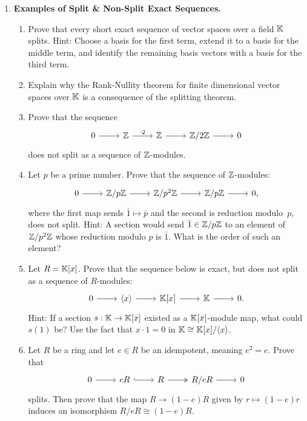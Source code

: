 \documentclass[12pt,reqno]{amsart}
\begin{document}
\begin{enumerate}[leftmargin=*, resume=problems]
\item \textbf{Examples of Split \& Non-Split Exact Sequences.}
\begin{enumerate}
\item Prove that every short exact sequence of vector spaces over a field $\mathbb{K}$ splits. Hint: Choose a basis for the first term, extend it to a basis for the middle term, and identify the remaining basis vectors with a basis for the third term. 
\item Explain why the Rank-Nullity theorem for finite dimensional vector spaces over $\mathbb{K}$ is a consequence of the splitting theorem. 
\item Prove that the sequence
\[
\begin{tikzcd}
0 \ar[r] & \ZZ \ar[r, "\cdot 2"] & \ZZ \ar[r] & \ZZ/2\ZZ \ar[r] & 0
\end{tikzcd}
\]
does not split as a sequence of $\mathbb{Z}$-modules.
\item Let $p$ be a prime number. Prove that the sequence of $\mathbb{Z}$-modules:
\[
\begin{tikzcd}
0 \ar[r] & \ZZ/p\ZZ \ar[r] & \ZZ/p^2\ZZ \ar[r] & \ZZ/p\ZZ \ar[r] & 0,
\end{tikzcd}
\]
where the first map sends $\bar 1\mapsto\bar p$ and the second is reduction modulo~$p$, does not split. Hint: A section would send $\bar 1\in \mathbb{Z}/p\mathbb{Z}$ to an element of $\mathbb{Z}/p^2\mathbb{Z}$ whose reduction modulo $p$ is $\bar 1$. What is the order of such an element?
\item Let $R=\mathbb{K}[x]$. Prove that the sequence below is exact, but does not split as a sequence of $R$-modules:
\[
\begin{tikzcd}
0 \ar[r] & \langle x \rangle \ar[r] & \KK[x] \ar[r] & \KK \ar[r] & 0.
\end{tikzcd}
\]
Hint: If a section $s:\mathbb{K}\to \mathbb{K}[x]$ existed as a $\mathbb{K}[x]$-module map, what could $s(1)$ be? Use the fact that $x\cdot 1=0$ in $\mathbb{K}\cong \mathbb{K}[x]/\langle x\rangle$.
\item Let $R$ be a ring and let $e\in R$ be an idempotent, meaning $e^2=e$. Prove that
\[
\begin{tikzcd}
0 \ar[r] & eR \ar[r, hook] & R \ar[r, two heads] & R/eR \ar[r] & 0
\end{tikzcd}
\]
splits. Then prove that the map $R\to (1-e)R$ given by $r\mapsto (1-e)r$ induces an isomorphism $R/eR\cong (1-e)R$.
\end{enumerate}
\end{enumerate}

\hrulefill
\end{document}
